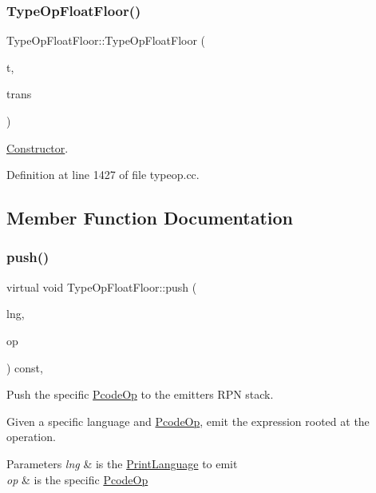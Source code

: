 \subsubsection{\texorpdfstring{TypeOpFloatFloor()}{TypeOpFloatFloor()}}
{\footnotesize\ttfamily Type\+Op\+Float\+Floor\+::\+Type\+Op\+Float\+Floor (\begin{DoxyParamCaption}\item[{\mbox{\hyperlink{class_type_factory}{Type\+Factory}} $\ast$}]{t,  }\item[{const \mbox{\hyperlink{class_translate}{Translate}} $\ast$}]{trans }\end{DoxyParamCaption})}



\mbox{\hyperlink{class_constructor}{Constructor}}. 



Definition at line 1427 of file typeop.\+cc.



\subsection{Member Function Documentation}
\mbox{\label{class_type_op_float_floor_ab361c274c7e25f09ebe16562fe012f24}} 
\subsubsection{\texorpdfstring{push()}{push()}}
{\footnotesize\ttfamily virtual void Type\+Op\+Float\+Floor\+::push (\begin{DoxyParamCaption}\item[{\mbox{\hyperlink{class_print_language}{Print\+Language}} $\ast$}]{lng,  }\item[{const \mbox{\hyperlink{class_pcode_op}{Pcode\+Op}} $\ast$}]{op }\end{DoxyParamCaption}) const\hspace{0.3cm}{\ttfamily [inline]}, {\ttfamily [virtual]}}



Push the specific \mbox{\hyperlink{class_pcode_op}{Pcode\+Op}} to the emitter\textquotesingle{}s R\+PN stack. 

Given a specific language and \mbox{\hyperlink{class_pcode_op}{Pcode\+Op}}, emit the expression rooted at the operation. 
\begin{DoxyParams}{Parameters}
{\em lng} & is the \mbox{\hyperlink{class_print_language}{Print\+Language}} to emit \\
\hline
{\em op} & is the specific \mbox{\hyperlink{class_pcode_op}{Pcode\+Op}} \\
\hline
\end{DoxyParams}


